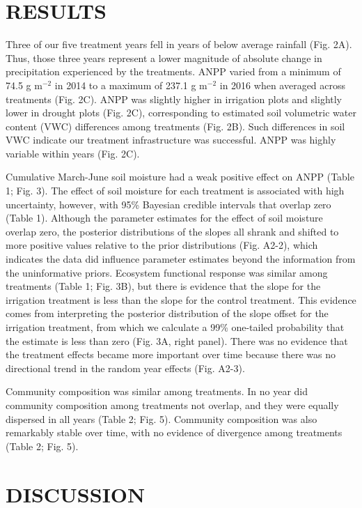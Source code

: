 \documentclass[fleqn,10pt,lineno]{wlpeerj} %
\begin{document}
\section{RESULTS}\label{results}

Three of our five treatment years fell in years of below average
rainfall (Fig. 2A). Thus, those three years represent a lower magnitude
of absolute change in precipitation experienced by the treatments. ANPP
varied from a minimum of 74.5 g m\(^{-2}\) in 2014 to a maximum of 237.1
g m\(^{-2}\) in 2016 when averaged across treatments (Fig. 2C). ANPP was
slightly higher in irrigation plots and slightly lower in drought plots
(Fig. 2C), corresponding to estimated soil volumetric water content
(VWC) differences among treatments (Fig. 2B). Such differences in soil
VWC indicate our treatment infrastructure was successful. ANPP was
highly variable within years (Fig. 2C).

Cumulative March-June soil moisture had a weak positive effect on ANPP
(Table 1; Fig. 3). The effect of soil moisture for each treatment is
associated with high uncertainty, however, with 95\% Bayesian credible
intervals that overlap zero (Table 1). Although the parameter estimates
for the effect of soil moisture overlap zero, the posterior
distributions of the slopes all shrank and shifted to more positive
values relative to the prior distributions (Fig. A2-2), which indicates
the data did influence parameter estimates beyond the information from
the uninformative priors. Ecosystem functional response was similar
among treatments (Table 1; Fig. 3B), but there is evidence that the
slope for the irrigation treatment is less than the slope for the
control treatment. This evidence comes from interpreting the posterior
distribution of the slope offset for the irrigation treatment, from
which we calculate a 99\% one-tailed probability that the estimate is
less than zero (Fig. 3A, right panel). There was no evidence that the
treatment effects became more important over time because there was no
directional trend in the random year effects (Fig. A2-3).

Community composition was similar among treatments. In no year did
community composition among treatments not overlap, and they were
equally dispersed in all years (Table 2; Fig. 5). Community composition
was also remarkably stable over time, with no evidence of divergence
among treatments (Table 2; Fig. 5).

\section{DISCUSSION}\label{discussion}
\end{document}
